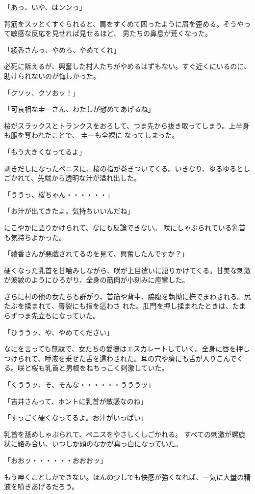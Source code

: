 ﻿\documentclass[book,tate]{jlreq}
\begin{document}
「あっ、いや、はンンっ」

背筋をスッとくすぐられると、肩をすくめて困ったように眉を歪める。そうやって敏感な反応を見せれば見せるほど、 男たちの鼻息が荒くなった。

「綾香さんっ、やめろ、やめてくれ」

必死に訴えるが、興奮した村人たちがやめるはずもない。すぐ近くにいるのに、助けられないのが悔しかった。

「クソッ、クソおッ！」

「可哀相な圭一さん、わたしが慰めてあげるね」

桜がスラックスとトランクスをおろして、つま先から抜き取ってしまう。上半身も服を奪われたことで、 圭一も全裸に なってしまった。

「もう大きくなってるよ」

剥きだしになったペニスに、桜の指が巻きついてくる。いきなり、ゆるゆるとしごかれて、先端から透明な汁が溢れ出した。

「ううっ、桜ちゃん・・・・・・」

「お汁が出てきたよ。気持ちいいんだね」

にこやかに語りかけられて、なにも反論できない。 咲にしゃぶられている乳首も気持ちよかった。

「綾香さんが悪戯されてるのを見て、興奮したんですか？」

硬くなった乳首を甘噛みしながら、咲が上目遣いに語りかけてくる。甘美な刺激が波紋のようにひろがり、全身の筋肉が小刻みに痙攣した。

さらに村の他の女たちも群がり、首筋や背中、脇腹を執拗に撫でまわされる。尻たぶを揉まれて、臀裂にも指を這わさ れた。肛門を押し揉まれたときは、たまらずつま先立ちになっていた。

「ひううッ、や、やめてください」

なにを言っても無駄で、女たちの愛撫はエスカレートしていく。全身に唇を押しつけられて、唾液を乗せた舌を這わされた。耳の穴や臍にも舌が入りこんでくる。咲と桜も乳首と男根をねちっこく刺激していた。

「くううッ、そ、そんな・・・・・・うううッ」

「吉井さんって、ホントに乳首が敏感なのね」

「すっごく硬くなってるよ。お汁がいっぱい」

乳首を舐めしゃぶられて、ペニスをやさしくしごかれる。 すべての刺激が螺旋状に絡み合い、いつしか頭のなかが真っ白になっていた。

「おおッ・・・・・・おおおッ」

もう呻くことしかできない。ほんの少しでも快感が強くなれば、一気に大量の精液を噴きあげるだろう。
\end{document}
